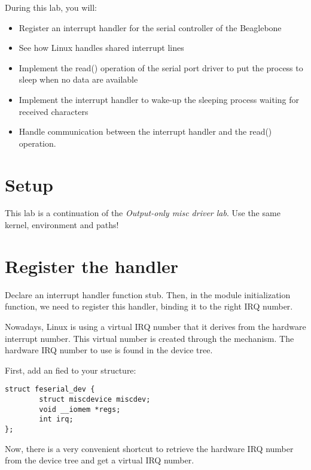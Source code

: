 
During this lab, you will:

\begin{itemize}
\item Register an interrupt handler for the serial controller of the
  Beaglebone
\item See how Linux handles shared interrupt lines
\item Implement the read() operation of the serial port driver to put
  the process to sleep when no data are available
\item Implement the interrupt handler to wake-up the sleeping process
  waiting for received characters
\item Handle communication between the interrupt handler and the
  read() operation.
\end{itemize}

\section{Setup}

This lab is a continuation of the {\em Output-only misc driver
lab}. Use the same kernel, environment and paths!

\section{Register the handler}

Declare an interrupt handler function stub. Then, in the module
initialization function, we need to register this handler, binding
it to the right IRQ number.

Nowadays, Linux is using a virtual IRQ number that it derives from the
hardware interrupt number. This virtual number is created through the
 mechanism. The hardware IRQ number to use is found in
the device tree.

First, add an  fied to your  structure:

\begin{verbatim}
struct feserial_dev {
        struct miscdevice miscdev;
        void __iomem *regs;
        int irq;
};
\end{verbatim}

Now, there is a very convenient shortcut to retrieve the
hardware IRQ number from the device tree and get a virtual IRQ number.

